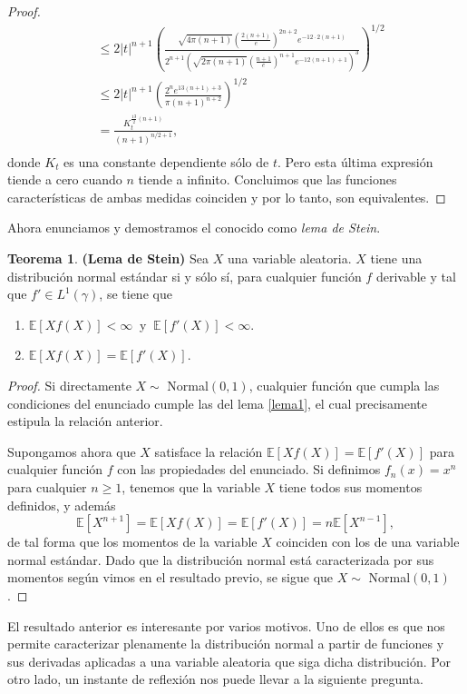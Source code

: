 \documentclass[letterpaper,twoside,12pt]{book}
\newcommand{\E}{\mathbb{E}}
\newcommand{\1}{\mathds{1}}
\theoremstyle{definition}
\theoremstyle{definition}
\newtheorem{teo}{Teorema}
\theoremstyle{remark}
\theoremstyle{definition}
\theoremstyle{definition}
\theoremstyle{definition}
\theoremstyle{definition}
\theoremstyle{definition}
\begin{document}
\begin{proof}
\begin{align*}
      &\leq 2|t|^{n+1}\left(\frac{\sqrt{4\pi(n+1)}\left(\tfrac{2(n+1)}{e}\right)^{2n+2}e^{-12\cdot 2(n+1)}}{2^{n+1}\left(\sqrt{2\pi(n+1)}\left(\tfrac{n+1}{e}\right)^{n+1}e^{-12(n+1)+1}\right)^{3}}\right)^{1/2}\\
      &\leq 2|t|^{n+1}\left(\frac{2^ne^{13(n+1)+3}}{\pi(n+1)^{n+2}}\right)^{1/2}\\
      &=\frac{K_t^{\tfrac{13}{2}(n+1)}}{(n+1)^{n/2+1}},\\
   \end{align*} 
   donde $K_t$ es una constante dependiente sólo de $t$. Pero esta última expresión tiende a cero cuando $n$ tiende a infinito. Concluimos que las funciones características de ambas medidas coinciden y por lo tanto, son equivalentes.
  \end{proof}

Ahora enunciamos y demostramos el conocido como \textit{lema de Stein}.
\begin{teo}\textbf{(Lema de Stein)} \label{LemaStein} Sea $X$ una variable aleatoria. $X$ tiene una distribución normal estándar si y sólo sí, para cualquier función $f$ derivable y tal que $f'\in L^{1}(\gamma)$, se tiene que
   \begin{enumerate}
       \item $\E\left[Xf(X)\right]<\infty \ $ y $ \ \E\left[f'(X)\right]<\infty$.
       \item $\E\left[Xf(X)\right]=\E\left[f'(X)\right]$.
   \end{enumerate}
\end{teo}
\begin{proof} 
  Si directamente $X\sim$ Normal$(0,1)$, cualquier función que cumpla las condiciones del enunciado cumple las del lema \ref{lema1}, el cual precisamente estipula la relación anterior. 

  Supongamos ahora que $X$ satisface la relación $\E\left[Xf(X)\right]=\E\left[f'(X)\right]$ para cualquier función $f$ con las propiedades del enunciado. Si definimos $f_n(x)=x^n$ para cualquier $n\geq1$, tenemos que la variable $X$ tiene todos sus momentos definidos, y además 
  \[
   \E\left[X^{n+1}\right]=\E\left[Xf(X)\right]=\E\left[f'(X)\right]=n\E\left[X^{n-1}\right],
  \] 
  de tal forma que los momentos de la variable $X$ coinciden con los de una variable normal estándar. Dado que la distribución normal está caracterizada por sus momentos según vimos en el resultado previo, se sigue que $X\sim$ Normal$(0,1)$.
 \end{proof}
El resultado anterior es interesante por varios motivos. Uno de ellos es que nos permite caracterizar plenamente la distribución normal a partir de funciones y sus derivadas aplicadas a una variable aleatoria que siga dicha distribución. Por otro lado, un instante de reflexión nos puede llevar a la siguiente pregunta.
\end{document}
